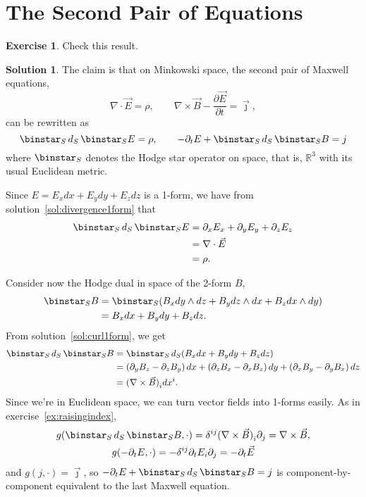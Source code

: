 \documentclass[11pt, a4paper]{report}
\theoremstyle{definition}
\newtheorem{exercise}{Exercise}[part]
\newtheorem{solution}{Solution}[part]
\newenvironment{ex}{\begin{exercise}}{\end{exercise}\pagebreak[1]}
\newenvironment{sol}{\begin{solution}}{\end{solution}\pagebreak[3]}
\renewcommand*{\d}{\ensuremath\mathop{}\mathopen{}d}
\renewcommand*{\star}{\ensuremath\mathop{}\mathopen\binstar\mathord{}}
\begin{document}
\section{The Second Pair of Equations}\label{sec:secondpairmaxwellequations}

\begin{ex}

Check this result.

\end{ex}

\begin{sol}

The claim is that on Minkowski space, the second pair of Maxwell equations,
\[
    \nabla \cdot \vec{E} = \rho, \qquad
    \nabla \times \vec{B} - \frac{\partial \vec{E}}{\partial t} = \vec{\jmath},
\]
can be rewritten as
\[
    \star_S \d_S \star_S E = \rho, \qquad
    -\partial_t E + \star_S \d_S \star_S B = j
\]
where $\star_S$ denotes the Hodge star operator on space, that is, $\mathbb{R}^3$ with its usual Euclidean metric.

Since $E = E_x dx + E_y dy + E_z dz$ is a 1-form, we have from solution~\ref{sol:divergence1form} that
\begin{align*}
    \star_S \d_S \star_S E &= \partial_x E_x + \partial_y E_y + \partial_z E_z \\
                             &= \nabla \cdot \vec{E} \\
                             &= \rho.
\end{align*}

Consider now the Hodge dual in space of the 2-form $B$,
\begin{align*}
    \star_S B &= \star_S (B_x dy \wedge dz + B_y dz \wedge dx + B_z dx \wedge dy) \\
              &= B_x dx + B_y dy + B_z dz.
\end{align*}
From solution~\ref{sol:curl1form}, we get
\begin{align*}
    \star_S \d_S \star_S B &= \star_S \d_S (B_x dx + B_y dy + B_z dz) \\
        &= \left(\partial_y B_z - \partial_z B_y\right) dx
            + \left(\partial_z B_x - \partial_x B_z\right) dy
            + \left(\partial_x B_y - \partial_y B_x\right) dz \\
        &= {(\nabla \times \vec{B})}_i dx^i.
\end{align*}
Since we're in Euclidean space, we can turn vector fields into 1-forms easily. As in exercise~\ref{ex:raisingindex},
\begin{gather*}
    g(\star_S \d_S \star_S B, \cdot)
        = \delta^{ij} {(\nabla \times \vec{B})}_i \partial_j
        = \nabla \times \vec{B}, \\
    g(-\partial_t E, \cdot) = -\delta^{ij} \partial_t E_i \partial_j = -\partial_t \vec{E}
\end{gather*}
and $g(j, \cdot) = \vec{\jmath}$,
so $-\partial_t E + \star_S \d_S \star_S B = j$ is component-by-component equivalent to the last Maxwell equation.

\end{sol}
\end{document}
